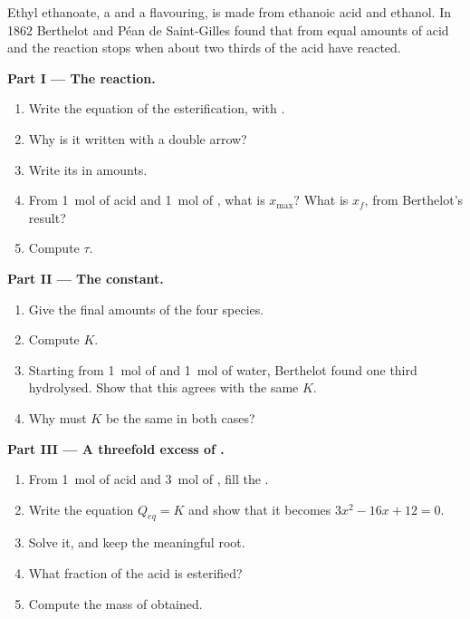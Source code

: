 \begin{problem}
\label{pb:g12:equilibrium:1}
Ethyl ethanoate, a  and a flavouring, is made from ethanoic acid
and ethanol. In 1862 Berthelot and Péan de Saint-Gilles found that from
equal amounts of acid and  the reaction stops when about two thirds
of the acid have reacted.

\medskip
\noindent\textbf{Part I --- The reaction.}
\begin{enumerate}
  \item Write the equation of the esterification, with .
  \item Why is it written with a double arrow?
  \item Write its  in amounts.
  \item From \qty{1}{mol} of acid and \qty{1}{mol} of , what is
        $x_{\max}$? What is $x_f$, from Berthelot's result?
  \item Compute $\tau$.
\end{enumerate}

\medskip
\noindent\textbf{Part II --- The constant.}
\begin{enumerate}[resume]
  \item Give the final amounts of the four species.
  \item Compute $K$.
  \item Starting from \qty{1}{mol} of  and \qty{1}{mol} of water,
        Berthelot found one third hydrolysed. Show that this agrees with
        the same $K$.
  \item Why must $K$ be the same in both cases?
\end{enumerate}

\medskip
\noindent\textbf{Part III --- A threefold excess of .}
\begin{enumerate}[resume]
  \item From \qty{1}{mol} of acid and \qty{3}{mol} of , fill the
        .
  \item Write the equation $Q_{eq} = K$ and show that it becomes
        $3x^2 - 16x + 12 = 0$.
  \item Solve it, and keep the meaningful root.
  \item What fraction of the acid is esterified?
  \item Compute the mass of  obtained.
\end{enumerate}


\end{problem}
